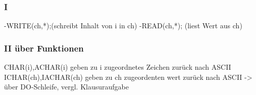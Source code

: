 \documentclass[11pt]{article}
\begin{document}
\subsubsection{I}
\label{sec-1.7.1}

     -WRITE(ch,*);(schreibt Inhalt von i in ch)
     -READ(ch,*); (liest Wert aus ch)
\subsubsection{II über Funktionen}
\label{sec-1.7.2}

    CHAR(i),ACHAR(i) geben zu i zugeordnetes Zeichen zurück nach ASCII
    ICHAR(ch),IACHAR(ch) geben zu ch zugeordenten wert zurück nach ASCII
    -> über DO-Schleife, vergl. Klausuraufgabe    
\end{document}
